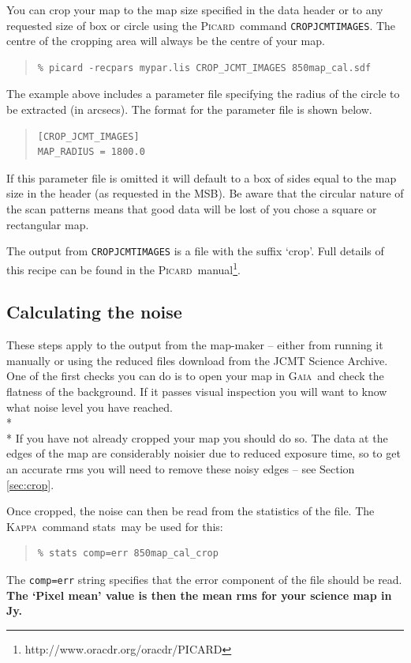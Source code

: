 \documentclass[twoside,11pt]{article}
\newcounter{box}
\newcommand{\xref}[3]{#1}
\newcommand{\xlabel}[1]{}
\renewcommand{\_}{\texttt{\symbol{95}}}
\newenvironment{myquote}{\begin{quote}\begin{small}}{\end{small}\end{quote}}
\newcommand{\gaia}{\xref{\textsc{Gaia}}{sun214}{}}
\newcommand{\Kappa}{\xref{\textsc{Kappa}}{sun95}{}}
\newcommand{\picard}{\xref{\textsc{Picard}}{sun265}{}}
\newcommand{\task}[1]{\textsf{#1}}
\newcommand{\param}[1]{\texttt{#1}}
\newcommand{\stats}{\xref{\task{stats}}{sun95}{STATS}}
\begin{document}
You can crop your map to the  map size specified in the data header or to any requested size of box or circle  using the \picard\ command \param{CROP\_JCMT\_IMAGES}. The centre of the cropping area will always be the centre of your map.
\begin{myquote}
\begin{verbatim}
% picard -recpars mypar.lis CROP_JCMT_IMAGES 850map_cal.sdf
\end{verbatim}
\end{myquote}
The example above includes a parameter file specifying the radius of the circle to be extracted (in arcsecs).  The format for the parameter file is shown below.
\begin{myquote}
\begin{verbatim}
[CROP_JCMT_IMAGES]
MAP_RADIUS = 1800.0
\end{verbatim}
\end{myquote}
If this parameter file is omitted it will default to a box of sides equal to the map size in the header (as requested in the MSB). Be aware that the circular nature of the scan patterns means that good data will be lost of you chose a square or rectangular map.

The output from \param{CROP\_JCMT\_IMAGES} is a file with the suffix `\_crop'. Full details of this recipe can be found in the \picard\ manual\footnote{http://www.oracdr.org/oracdr/PICARD}. 

\subsection{\xlabel{noise}Calculating the noise}
These steps apply to the output from the map-maker -- either from running it manually or using the reduced files download from the JCMT Science Archive. One of the first checks you can do is to open your map in \gaia\ and check the flatness of the background. If it passes visual inspection you will want to know what noise level you have reached.
\\*\\*
If you have not already cropped your map you should do so. The data at the edges of the map are considerably noisier due to reduced exposure time, so to get an accurate rms you will need to remove these noisy edges -- see Section \ref{sec:crop}. 

Once cropped, the noise can then be read from the statistics of the file. The \Kappa\ command \stats\ may be used for this:
\begin{myquote}
\begin{verbatim}
% stats comp=err 850map_cal_crop
\end{verbatim}
\end{myquote}
The \param{comp=err} string specifies that the error component of the file should be read. \textbf{The `Pixel mean' value is then the mean rms for your science map in Jy.}
\end{document}
